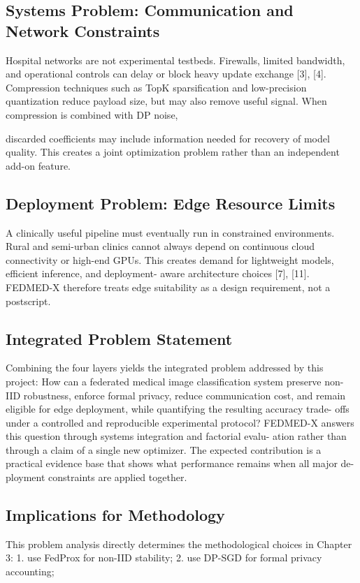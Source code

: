 \subsection{Systems Problem: Communication and Network Constraints}
Hospital networks are not experimental testbeds. Firewalls, limited bandwidth, and operational controls can delay or block heavy update exchange [3], [4]. Compression techniques such as TopK sparsification and low-precision quantization reduce payload size, but may also remove useful signal. When compression is combined with DP noise,

discarded coefficients may include information needed for recovery of model quality.
This creates a joint optimization problem rather than an independent add-on feature.
\subsection{Deployment Problem: Edge Resource Limits}
A clinically useful pipeline must eventually run in constrained environments. Rural and semi-urban clinics cannot always depend on continuous cloud connectivity or high-end
GPUs. This creates demand for lightweight models, efficient inference, and deployment- aware architecture choices [7], [11]. FEDMED-X therefore treats edge suitability as a design requirement, not a postscript.
\subsection{Integrated Problem Statement}
Combining the four layers yields the integrated problem addressed by this project:
How can a federated medical image classification system preserve non-IID robustness, enforce formal privacy, reduce communication cost, and remain eligible for edge deployment, while quantifying the resulting accuracy trade- offs under a controlled and reproducible experimental protocol?
FEDMED-X answers this question through systems integration and factorial evalu- ation rather than through a claim of a single new optimizer. The expected contribution is a practical evidence base that shows what performance remains when all major de- ployment constraints are applied together.
\subsection{Implications for Methodology}
This problem analysis directly determines the methodological choices in Chapter 3:
1. use FedProx for non-IID stability; 2. use DP-SGD for formal privacy accounting;

